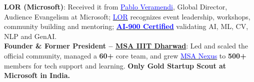 \begin{itemize}[leftmargin=0.15in, label={}]
{{{    \textbf{LOR (Microsoft)}{: Received it from \href{https://www.linkedin.com/in/pveramendi}{\textcolor{blue}{Pablo Veramendi}}, Global Director, Audience Evangelism at Microsoft; \href{https://drive.google.com/file/d/1fPSHlkk8T89CJ55hPlJQ-sDO-dwutkxM/view?usp=sharing}{\textcolor{blue}{LOR}} recognizes event leadership, workshops, community building and mentoring; \href{https://learn.microsoft.com/en-in/users/aryanjstar/credentials/e4c4296f82bdf8ad?ref=https%3A%2F%2F}{\textcolor{blue}{\textbf{AI-900 Certified}}} validating AI, ML, CV, NLP and GenAI.} \\[2pt]





    \textbf{Founder \& Former President – \href{https://msa-iiitdwd.vercel.app}{MSA IIIT Dharwad}}{: 
    Led and scaled the official community, managed a \textbf{60+} core team, and grew 
    \href{http://chat.whatsapp.com/HiE8qUaaIpYJNA5WPuCozD}{\textcolor{blue}{MSA Nexus}} to \textbf{500+} members for tech support and learning. 
    \textbf{Only Gold Startup Scout at Microsoft in India.}} \\[2pt]




    
}}}
\end{itemize}
